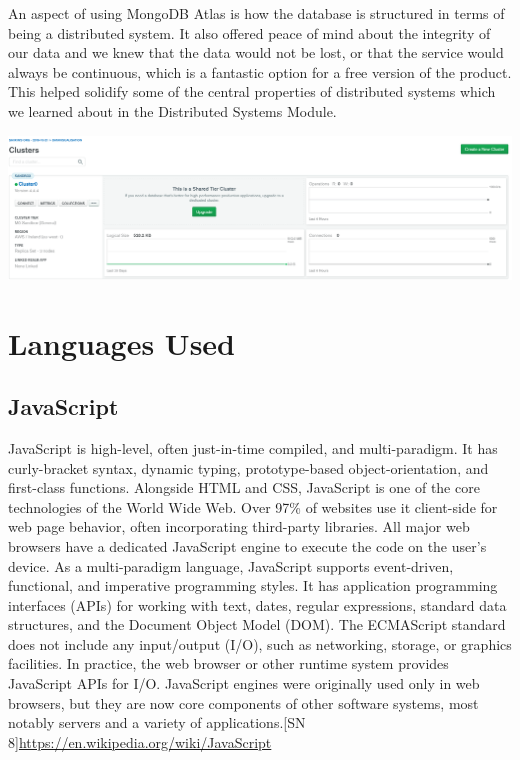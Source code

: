 An aspect of using MongoDB Atlas is how the database is structured in terms of being a distributed system. It also offered peace of mind about the integrity of our data and we knew that the data would not be lost, or that the service would always be continuous, which is a fantastic option for a free version of the product. 
This helped solidify  some of the central properties of distributed systems which we learned about in the Distributed Systems Module.
\begin{center}    
      \includegraphics[scale=0.5]{img/clusterDB.PNG}
\end{center}

\section{Languages Used}
\subsection{JavaScript}
JavaScript is high-level, often just-in-time compiled, and multi-paradigm. It has curly-bracket syntax, dynamic typing, prototype-based object-orientation, and first-class functions. 
Alongside HTML and CSS, JavaScript is one of the core technologies of the World Wide Web. Over 97\% of websites use it client-side for web page behavior, often incorporating third-party libraries. All major web browsers have a dedicated JavaScript engine to execute the code on the user's device. 
As a multi-paradigm language, JavaScript supports event-driven, functional, and imperative programming styles. It has application programming interfaces (APIs) for working with text, dates, regular expressions, standard data structures, and the Document Object Model (DOM).
The ECMAScript standard does not include any input/output (I/O), such as networking, storage, or graphics facilities. In practice, the web browser or other runtime system provides JavaScript APIs for I/O.
JavaScript engines were originally used only in web browsers, but they are now core components of other software systems, most notably servers and a variety of applications.[SN 8]\url{https://en.wikipedia.org/wiki/JavaScript}
